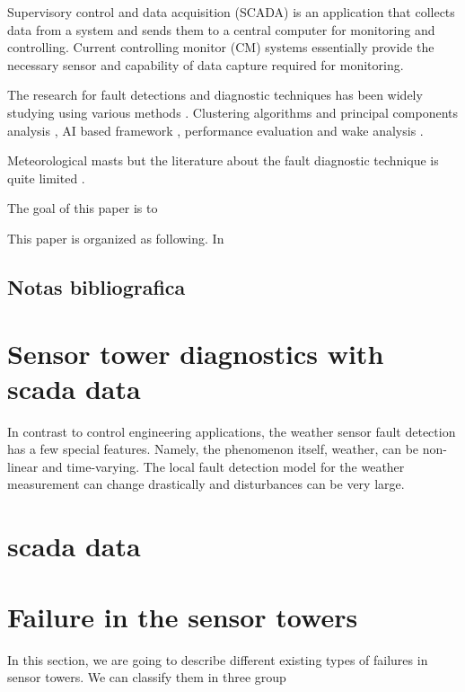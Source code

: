 \documentclass[journal]{IEEEtran}
\begin{document}
Supervisory control and data acquisition (SCADA) is an application that collects data from a system and sends them to a central computer for monitoring and controlling. Current controlling monitor (CM) systems essentially provide the necessary sensor and capability of data capture required for monitoring.

The research for  fault detections and diagnostic techniques has been widely studying using various methods \cite{tchakoua2014wind,wymore2015survey}. 
Clustering algorithms and principal components analysis \cite{kim2011use}, AI based framework \cite{wang2014scada}, performance evaluation and wake analysis \cite{astolfi2016mathematical}.

Meteorological masts  
but the literature about the fault diagnostic technique is quite limited \cite{hasu2006weather}  .


The goal of this paper is to


This paper is organized as following. In


\subsection{Notas bibliografica}



\cite{kusiak2011prediction}

\cite{lu2009review}

\cite{schlechtingen2012condition}

\cite{schlechtingen2011comparative}

\cite{yang2014wind}




\section{Sensor tower diagnostics with scada data}
In contrast to control engineering applications, the weather sensor fault detection has a few special features. Namely, the phenomenon itself, weather, can be non-linear and time-varying. The local fault detection model for the weather measurement can change drastically and disturbances can be very large.

\section{scada data}\label{sec:scadaData}
\section{Failure in the sensor towers}\label{sec:failures}
In this section, we are going to describe different existing types of failures in sensor towers. We can classify them in three group
\end{document}
